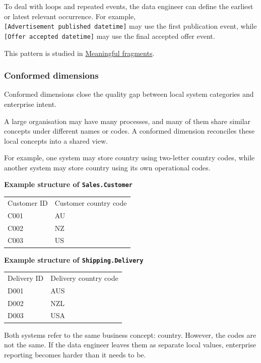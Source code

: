 \documentclass[10pt,openany,10pt]{book}
\newcounter{none}
\let\podeToprule\toprule
\let\podeMidrule\midrule
\let\podeBottomrule\bottomrule
\renewcommand{\toprule}{\arrayrulecolor{pbiGrid}\podeToprule}
\renewcommand{\midrule}{\arrayrulecolor{pbiGrid}\podeMidrule}
\renewcommand{\bottomrule}{\arrayrulecolor{pbiGrid}\podeBottomrule}
\begin{document}
To deal with loops and repeated events, the data engineer can define the
earliest or latest relevant occurrence. For example,
\texttt{{[}Advertisement\ published\ datetime{]}} may use the first
publication event, while \texttt{{[}Offer\ accepted\ datetime{]}} may
use the final accepted offer event.

This pattern is studied in
\hyperref[docs-creating-information-meaningful-fragments]{Meaningful
fragments}.

\subsubsection{Conformed dimensions}\label{conformed-dimensions}

Conformed dimensions close the quality gap between local system
categories and enterprise intent.

A large organisation may have many processes, and many of them share
similar concepts under different names or codes. A conformed dimension
reconciles these local concepts into a shared view.

For example, one system may store country using two-letter country
codes, while another system may store country using its own operational
codes.

\textbf{Example structure of \texttt{Sales.Customer}}

{\def\LTcaptype{none} %
\begin{longtable}[]{@{}ll@{}}
\toprule\noalign{}
Customer ID & Customer country code \\
\midrule\noalign{}
\endhead
\bottomrule\noalign{}
\endlastfoot
C001 & AU \\
C002 & NZ \\
C003 & US \\
\end{longtable}
}

\textbf{Example structure of \texttt{Shipping.Delivery}}

{\def\LTcaptype{none} %
\begin{longtable}[]{@{}ll@{}}
\toprule\noalign{}
Delivery ID & Delivery country code \\
\midrule\noalign{}
\endhead
\bottomrule\noalign{}
\endlastfoot
D001 & AUS \\
D002 & NZL \\
D003 & USA \\
\end{longtable}
}

Both systems refer to the same business concept: country. However, the
codes are not the same. If the data engineer leaves them as separate
local values, enterprise reporting becomes harder than it needs to be.
\end{document}
